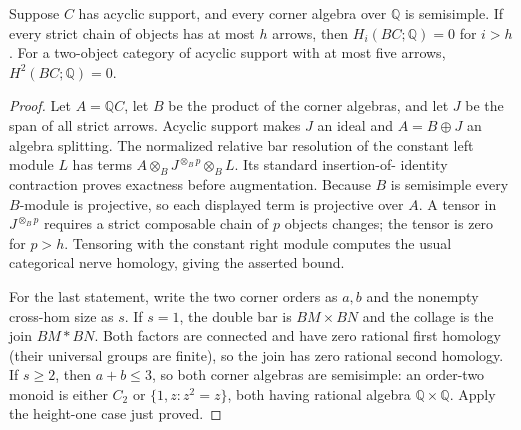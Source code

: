 \begin{lemma}
\label{CP2:A-semisimple-height}
Suppose $C$ has acyclic support, and every corner algebra over
$\mathbb Q$ is semisimple. If every strict chain of objects has at
most $h$ arrows, then $H_i(BC;\mathbb Q)=0$ for $i>h$.
For a two-object category of acyclic support with at most five
arrows, $H^2(BC;\mathbb Q)=0$.
\end{lemma}
\begin{proof}
Let $A=\mathbb QC$, let $B$ be the product of the corner algebras,
and let $J$ be the span of all strict arrows. Acyclic support makes
$J$ an ideal and $A=B\oplus J$ an algebra splitting. The normalized
relative bar resolution of the constant left module $L$ has terms
$A\otimes_B J^{\otimes_B p}\otimes_B L$. Its standard insertion-of-
identity contraction proves exactness before augmentation. Because
$B$ is semisimple every $B$-module is projective, so each displayed
term is projective over $A$. A tensor in $J^{\otimes_B p}$ requires
a strict composable chain of $p$ objects changes; the tensor is
zero for $p>h$. Tensoring with the constant right module computes
the usual categorical nerve homology, giving the asserted bound.

For the last statement, write the two corner orders as $a,b$ and
the nonempty cross-hom size as $s$. If $s=1$, the double bar is
$BM\times BN$ and the collage is the join $BM*BN$. Both factors
are connected and have zero rational first homology (their
universal groups are finite), so the join has zero rational second
homology. If $s\ge2$, then $a+b\le3$, so both corner algebras
are semisimple: an order-two monoid is either $C_2$ or
$\{1,z:z^2=z\}$, both having rational algebra $\mathbb Q\times
\mathbb Q$. Apply the height-one case just proved.
\end{proof}

